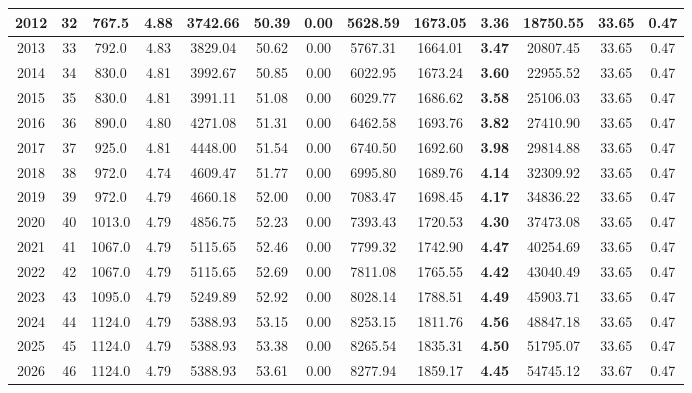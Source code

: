 {\begin{center}
\begin{tabular}[htb]{|c|c||c|c|c|c|c|c||c|c||c|c|c||}
\hline 
 2012 &  32 &  767.5 &  4.88 &  3742.66 &  50.39 &  0.00 &  5628.59 &  1673.05 &  {\bf 3.36} &  18750.55 &  33.65 &  0.47 \\ 
\hline 
 2013 &  33 &  792.0 &  4.83 &  3829.04 &  50.62 &  0.00 &  5767.31 &  1664.01 &  {\bf 3.47} &  20807.45 &  33.65 &  0.47 \\ 
\hline 
 2014 &  34 &  830.0 &  4.81 &  3992.67 &  50.85 &  0.00 &  6022.95 &  1673.24 &  {\bf 3.60} &  22955.52 &  33.65 &  0.47 \\ 
\hline 
 2015 &  35 &  830.0 &  4.81 &  3991.11 &  51.08 &  0.00 &  6029.77 &  1686.62 &  {\bf 3.58} &  25106.03 &  33.65 &  0.47 \\ 
\hline 
 2016 &  36 &  890.0 &  4.80 &  4271.08 &  51.31 &  0.00 &  6462.58 &  1693.76 &  {\bf 3.82} &  27410.90 &  33.65 &  0.47 \\ 
\hline 
 2017 &  37 &  925.0 &  4.81 &  4448.00 &  51.54 &  0.00 &  6740.50 &  1692.60 &  {\bf 3.98} &  29814.88 &  33.65 &  0.47 \\ 
\hline 
 2018 &  38 &  972.0 &  4.74 &  4609.47 &  51.77 &  0.00 &  6995.80 &  1689.76 &  {\bf 4.14} &  32309.92 &  33.65 &  0.47 \\ 
\hline 
 2019 &  39 &  972.0 &  4.79 &  4660.18 &  52.00 &  0.00 &  7083.47 &  1698.45 &  {\bf 4.17} &  34836.22 &  33.65 &  0.47 \\ 
\hline 
 2020 &  40 &  1013.0 &  4.79 &  4856.75 &  52.23 &  0.00 &  7393.43 &  1720.53 &  {\bf 4.30} &  37473.08 &  33.65 &  0.47 \\ 
\hline 
 2021 &  41 &  1067.0 &  4.79 &  5115.65 &  52.46 &  0.00 &  7799.32 &  1742.90 &  {\bf 4.47} &  40254.69 &  33.65 &  0.47 \\ 
\hline 
 2022 &  42 &  1067.0 &  4.79 &  5115.65 &  52.69 &  0.00 &  7811.08 &  1765.55 &  {\bf 4.42} &  43040.49 &  33.65 &  0.47 \\ 
\hline 
 2023 &  43 &  1095.0 &  4.79 &  5249.89 &  52.92 &  0.00 &  8028.14 &  1788.51 &  {\bf 4.49} &  45903.71 &  33.65 &  0.47 \\ 
\hline 
 2024 &  44 &  1124.0 &  4.79 &  5388.93 &  53.15 &  0.00 &  8253.15 &  1811.76 &  {\bf 4.56} &  48847.18 &  33.65 &  0.47 \\ 
\hline 
 2025 &  45 &  1124.0 &  4.79 &  5388.93 &  53.38 &  0.00 &  8265.54 &  1835.31 &  {\bf 4.50} &  51795.07 &  33.65 &  0.47 \\ 
\hline 
 2026 &  46 &  1124.0 &  4.79 &  5388.93 &  53.61 &  0.00 &  8277.94 &  1859.17 &  {\bf 4.45} &  54745.12 &  33.67 &  0.47 \\ 

\end{tabular}
\end{center}}

